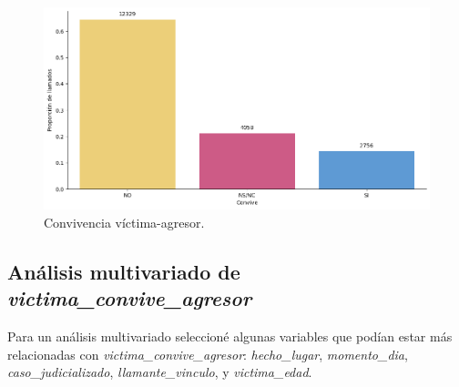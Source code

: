 \documentclass[10 pt]{article}
\begin{document}
\begin{figure}[H]
    \begin{center}
    \includegraphics[scale=.5]{images/latex_convive.png}
    \caption{Convivencia víctima-agresor.}
    \label{convivencia}
    \end{center}
    \end{figure}


\subsection*{Análisis multivariado de \textit{victima\_convive\_agresor}}\label{faltantes}

Para un análisis multivariado seleccioné algunas variables que podían estar más relacionadas con \textit{victima\_convive\_agresor}: \textit{hecho\_lugar}, \textit{momento\_dia}, \textit{caso\_judicializado}, \textit{llamante\_vinculo}, y \textit{victima\_edad}. 
\end{document}

